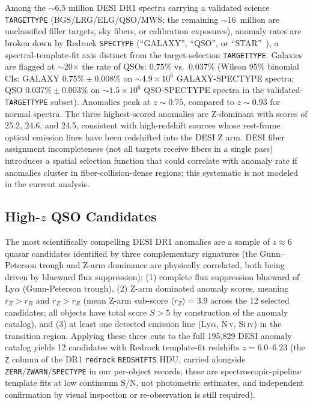 \documentclass[aps,prd,twocolumn,superscriptaddress,showpacs,preprintnumbers,nofootinbib,longbibliography,floatfix]{revtex4-2}
\begin{document}
Among the ${\sim}6.5$ million DESI DR1 spectra carrying a validated science \texttt{TARGETTYPE} (BGS/LRG/ELG/QSO/MWS; the remaining ${\sim}16$~million are unclassified filler targets, sky fibers, or calibration exposures), anomaly rates are broken down by Redrock \texttt{SPECTYPE} (``GALAXY'', ``QSO'', or ``STAR''~\cite{DESI2025DR1}), a spectral-template-fit axis distinct from the target-selection \texttt{TARGETTYPE}. Galaxies are flagged at $\sim$20$\times$ the rate of QSOs: $0.75\%$ vs.\ $0.037\%$ (Wilson 95\% binomial CIs: GALAXY $0.75\% \pm 0.008\%$ on $\sim 4.9\times10^6$ GALAXY-SPECTYPE spectra; QSO $0.037\% \pm 0.003\%$ on $\sim 1.5\times10^6$ QSO-SPECTYPE spectra in the validated-\texttt{TARGETTYPE} subset). Anomalies peak at $z \sim 0.75$, compared to $z \sim 0.93$ for normal spectra. The three highest-scored anomalies are Z-dominant with scores of 25.2, 24.6, and 24.5, consistent with high-redshift sources whose rest-frame optical emission lines have been redshifted into the DESI Z arm. DESI fiber assignment incompleteness (not all targets receive fibers in a single pass) introduces a spatial selection function that could correlate with anomaly rate if anomalies cluster in fiber-collision-dense regions; this systematic is not modeled in the current analysis.

\subsection{High-$z$ QSO Candidates}\label{sec:highz}

The most scientifically compelling DESI DR1 anomalies are a sample of $z \approx 6$ quasar candidates identified by three complementary signatures (the Gunn--Peterson trough and Z-arm dominance are physically correlated, both being driven by blueward flux suppression): (1) complete flux suppression blueward of Ly$\alpha$ (Gunn-Peterson trough), (2) Z-arm dominated anomaly scores, meaning $r_Z > r_B$ and $r_Z > r_R$ (mean Z-arm sub-score $\langle r_Z \rangle = 3.9$ across the 12 selected candidates; all objects have total score $S > 5$ by construction of the anomaly catalog), and (3) at least one detected emission line (Ly$\alpha$, N\,\textsc{v}, Si\,\textsc{iv}) in the transition region. Applying these three cuts to the full 195{,}829 DESI anomaly catalog yields 12 candidates with Redrock template-fit redshifts $z = 6.0$--$6.23$ (the \texttt{Z} column of the DR1 \texttt{redrock} \texttt{REDSHIFTS} HDU, carried alongside \texttt{ZERR}/\texttt{ZWARN}/\texttt{SPECTYPE} in our per-object records; these are spectroscopic-pipeline template fits at low continuum S/N, not photometric estimates, and independent confirmation by visual inspection or re-observation is still required).
\end{document}

